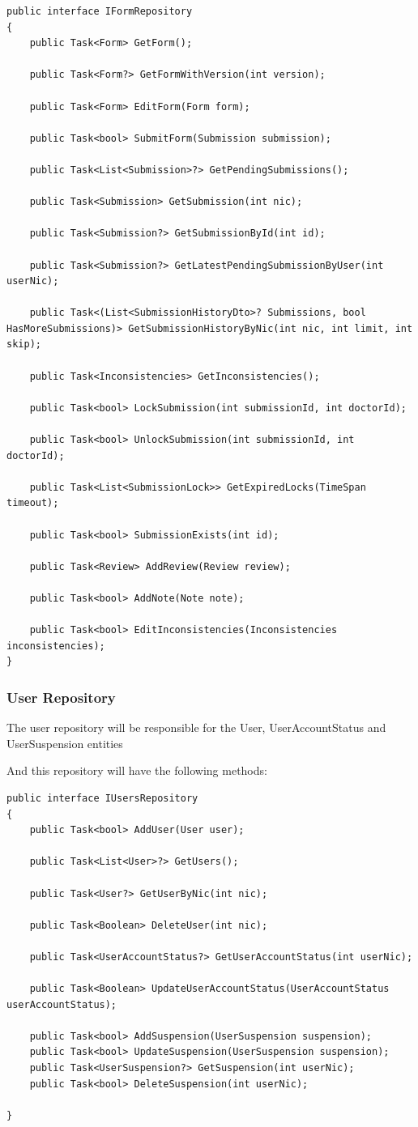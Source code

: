 \begin{lstlisting}[style=sharpc]
public interface IFormRepository
{
	public Task<Form> GetForm();
	
	public Task<Form?> GetFormWithVersion(int version);
	
	public Task<Form> EditForm(Form form);
	
	public Task<bool> SubmitForm(Submission submission);
	
	public Task<List<Submission>?> GetPendingSubmissions();
	
	public Task<Submission> GetSubmission(int nic);
	
	public Task<Submission?> GetSubmissionById(int id);
	
	public Task<Submission?> GetLatestPendingSubmissionByUser(int userNic);
	
	public Task<(List<SubmissionHistoryDto>? Submissions, bool HasMoreSubmissions)> GetSubmissionHistoryByNic(int nic, int limit, int skip);
	
	public Task<Inconsistencies> GetInconsistencies();
	
	public Task<bool> LockSubmission(int submissionId, int doctorId);
	
	public Task<bool> UnlockSubmission(int submissionId, int doctorId);
	
	public Task<List<SubmissionLock>> GetExpiredLocks(TimeSpan timeout);
	
	public Task<bool> SubmissionExists(int id);
	
	public Task<Review> AddReview(Review review);
	
	public Task<bool> AddNote(Note note);
	
	public Task<bool> EditInconsistencies(Inconsistencies inconsistencies);
}
\end{lstlisting}

\subsubsection{User Repository}

The user repository will be responsible for the User, UserAccountStatus and UserSuspension entities

And this repository will have the following methods:
\begin{lstlisting}[style=sharpc]
public interface IUsersRepository
{
	public Task<bool> AddUser(User user);
	
	public Task<List<User>?> GetUsers();
	
	public Task<User?> GetUserByNic(int nic);
	
	public Task<Boolean> DeleteUser(int nic);
	
	public Task<UserAccountStatus?> GetUserAccountStatus(int userNic);
	
	public Task<Boolean> UpdateUserAccountStatus(UserAccountStatus userAccountStatus);
	
	public Task<bool> AddSuspension(UserSuspension suspension);
	public Task<bool> UpdateSuspension(UserSuspension suspension);
	public Task<UserSuspension?> GetSuspension(int userNic);
	public Task<bool> DeleteSuspension(int userNic);
	
}
\end{lstlisting}

